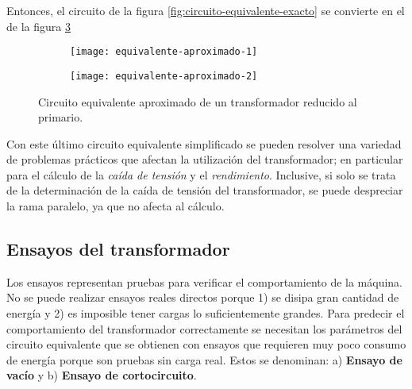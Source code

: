 Entonces, el circuito de la figura \ref{fig:circuito-equivalente-exacto} se convierte en el de la figura \ref{fig:aproximado-2}

\begin{figure}[H]
	\centering
	\begin{subfigure}[b]{0.4\textwidth}
		\centering
		\texttt{[image: equivalente-aproximado-1]}
		\subcaption{}
		\label{fig:aproximado-1}
	\end{subfigure}
	\begin{subfigure}[b]{0.4\textwidth}
		\centering
		\texttt{[image: equivalente-aproximado-2]}
		\subcaption{}
		\label{fig:aproximado-2}
	\end{subfigure}
	\caption{Circuito equivalente aproximado de un transformador reducido al primario.}
\end{figure}

Con este último circuito equivalente simplificado se pueden resolver una variedad de problemas prácticos que afectan la utilización del transformador; en particular para el cálculo de la \textsl{caída de tensión} y el \textsl{rendimiento}. Inclusive, si solo se trata de la determinación de la caída de tensión del transformador, se puede despreciar la rama paralelo, ya que no afecta al cálculo.

\subsection{Ensayos del transformador}
Los ensayos representan pruebas para verificar el comportamiento de la máquina. No se puede realizar ensayos reales directos porque 1) se disipa gran cantidad de energía y 2) es imposible tener cargas lo suficientemente grandes.
Para predecir el comportamiento del transformador correctamente se necesitan los parámetros del circuito equivalente que se obtienen con ensayos que requieren muy poco consumo de energía porque son pruebas sin carga real. Estos se denominan: a) \textbf{Ensayo de vacío} y b) \textbf{Ensayo de cortocircuito}.
